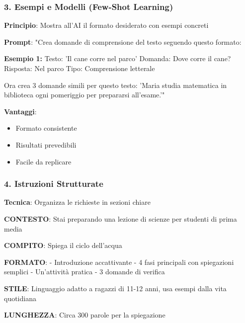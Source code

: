 \documentclass[aspectratio=169]{beamer}
\begin{document}
\begin{frame}
\frametitle{3. Esempi e Modelli (Few-Shot Learning)}
\textbf{Principio}: Mostra all'AI il formato desiderato con esempi concreti

\begin{examplebox}
\textbf{Prompt}: "Crea domande di comprensione del testo seguendo questo formato:

\textbf{Esempio 1:}
Testo: 'Il cane corre nel parco'
Domanda: Dove corre il cane?
Risposta: Nel parco
Tipo: Comprensione letterale

Ora crea 3 domande simili per questo testo: 'Maria studia matematica in biblioteca ogni pomeriggio per prepararsi all'esame.'"
\end{examplebox}

\pause
\textbf{Vantaggi}:
\begin{itemize}
    \item Formato consistente
    \item Risultati prevedibili
    \item Facile da replicare
\end{itemize}
\end{frame}
%
%
\begin{frame}
\frametitle{4. Istruzioni Strutturate}
\textbf{Tecnica}: Organizza le richieste in sezioni chiare

\begin{examplebox}
\textbf{CONTESTO}: Stai preparando una lezione di scienze per studenti di prima media

\textbf{COMPITO}: Spiega il ciclo dell'acqua

\textbf{FORMATO}: 
- Introduzione accattivante
- 4 fasi principali con spiegazioni semplici
- Un'attività pratica
- 3 domande di verifica

\textbf{STILE}: Linguaggio adatto a ragazzi di 11-12 anni, usa esempi dalla vita quotidiana

\textbf{LUNGHEZZA}: Circa 300 parole per la spiegazione
\end{examplebox}
\end{frame}
%
%
\end{document}
